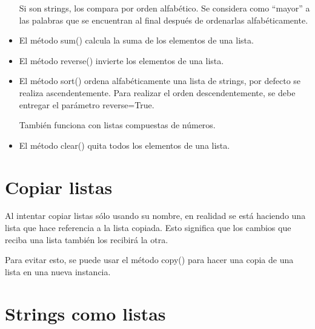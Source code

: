 \documentclass{report}
\newcommand{\doble}[1]{``#1''}
\begin{document}
\begin{itemize}

  Si son strings, los compara por orden alfabético. Se considera como \doble{mayor} a las palabras que se encuentran al final después de ordenarlas alfabéticamente.


  \item El método sum() calcula la suma de los elementos de una lista.
  

  \item El método reverse() invierte los elementos de una lista.
  

  \item El método sort() ordena alfabéticamente una lista de strings, por defecto se realiza ascendentemente. Para realizar el orden descendentemente, se debe entregar el parámetro reverse=True.
  
  
  También funciona con listas compuestas de números.


  \item El método clear() quita todos los elementos de una lista.


\end{itemize}

\section{Copiar listas}

Al intentar copiar listas sólo usando su nombre, en realidad se está haciendo una lista que hace referencia a la lista copiada. Esto significa que los cambios que reciba una lista también los recibirá la otra.


Para evitar esto, se puede usar el método copy() para hacer una copia de una lista en una nueva instancia.


\section{Strings como listas}
\end{document}
